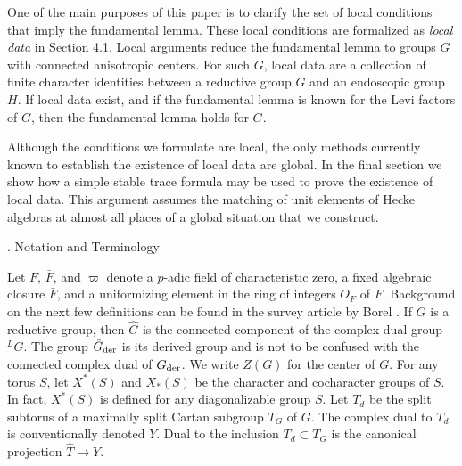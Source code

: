 One of the main purposes of this paper is to clarify the set of
local conditions that imply the fundamental lemma.  These
local conditions are formalized as {\it local data\/} in Section
4.1.  Local arguments reduce the fundamental lemma to 
groups $G$ with connected anisotropic centers.  For such $G$, 
local data are a collection of finite
character identities between a reductive group $G$ and an endoscopic
group $H$.  If local data exist, and if the fundamental lemma
is known for the Levi factors of $G$, then the fundamental lemma
holds for $G$.

Although the conditions we formulate are local, the only methods
currently known to establish the existence of local data are global.
In the final section we show how a simple stable
trace formula 
may be used to prove the existence of local data.  This argument
assumes the matching of unit elements of Hecke algebras at almost
all places of a global situation that we construct.

. Notation and Terminology \endhead

Let $F$, $\bar F$, and $\varpi$  denote a $p$-adic
field of characteristic zero, 
a fixed algebraic closure $\bar F$, 
and a uniformizing element
in the ring of integers $O_F$ of $F$.  Background
on the next few definitions can be found in the survey article by
Borel \cite{B}.
If $G$ is a reductive
group, then  $\hat G$ is the connected component of the
complex dual group ${}^L\!G$.  The group $\hat G_{\text{der}}$ is
its derived group and is not to be confused with the connected
complex dual of $G_{\text{der}}$.  We write $Z(G)$ for
the center of $G$.  
For any torus $S$, let $X^*(S)$ and 
$X_*(S)$ be the character and cocharacter groups of $S$.
In fact, $X^*(S)$ is defined for any diagonalizable group $S$.
Let $T_d$ be the split subtorus of a maximally
split Cartan subgroup $T_G$ of $G$.
The complex dual to $T_d$ is conventionally denoted $Y$.
Dual to the inclusion $T_d \subset T_G$ is the
canonical projection $\hat T \to Y$.

